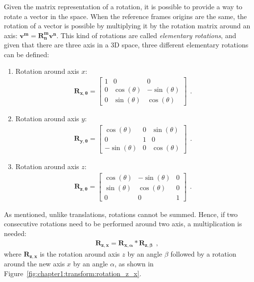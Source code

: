Given the matrix representation of a rotation, it is possible to provide a way to rotate a vector in the space. When the reference frames origins are the same, the rotation of a vector is possible by multiplying it by the rotation matrix around an axis: $\bm{v^m} = \bm{R_n^m} \bm{v^n}$. This kind of rotations are called \emph{elementary rotations}, and given that there are three axis in a 3D space, three different elementary rotations can be defined:
\begin{enumerate}
    \item{Rotation around axis $x$: \begin{align*}
            \bm{R_{x, \theta}} = \begin{bmatrix}
                1 & 0 & 0 \\ 0 & \cos{\left(\theta\right)} & -\sin{\left(\theta\right)} \\ 0 & \sin{\left(\theta\right)} & \cos{\left(\theta\right)}
            \end{bmatrix}~~.
    \end{align*}}
    \item{Rotation around axis $y$: \begin{align*}
        \bm{R_{y, \theta}} = \begin{bmatrix}
             \cos{\left(\theta\right)} & 0 &  \sin{\left(\theta\right)} \\ 0 & 1 & 0 \\  -\sin{\left(\theta\right)} & 0 & \cos{\left(\theta\right)}
        \end{bmatrix}~~.
    \end{align*}}
    \item{Rotation around axis $z$: \begin{align*}
        \bm{R_{z, \theta}} = \begin{bmatrix}
            \cos{\left(\theta\right)} & -\sin{\left(\theta\right)} & 0 \\ \sin{\left(\theta\right)} & \cos{\left(\theta\right)} & 0 \\ 0 & 0 & 1
        \end{bmatrix}~~.
    \end{align*}}
\end{enumerate}

As mentioned, unlike translations, rotations cannot be summed. Hence, if two consecutive rotations need to be performed around two axis, a multiplication is needed:
\begin{align}
    \bm{R_{z,x}} = \bm{R_{x, \alpha}} * \bm{R_{z, \beta}}~~,
\end{align}
where $\bm{R_{z,x}}$ is the rotation around axis $z$ by an angle $\beta$ followed by a rotation around the new axis $x$ by an angle $\alpha$, as shown in Figure~\ref{fig:chapter1:transform:rotation_z_x}.

